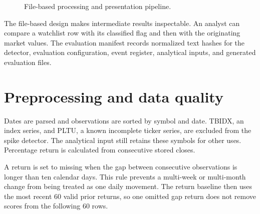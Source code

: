 \begin{figure}[htbp]
\centering
{}
\caption{File-based processing and presentation pipeline.}
\label{fig:long-pipeline}
\end{figure}

The file-based design makes intermediate results inspectable. An analyst can
compare a watchlist row with its classified flag and then with the originating
market values. The evaluation manifest records normalized text hashes for the
detector, evaluation configuration, event register, analytical inputs, and
generated evaluation files.

\section{Preprocessing and data quality}

Dates are parsed and observations are sorted by symbol and date. TBIDX, an
index series, and PLTU, a known incomplete ticker series, are excluded from the
spike detector. The analytical input still retains these symbols for other
uses. Percentage return is calculated from consecutive stored closes.

A return is set to missing when the gap between consecutive observations is
longer than ten calendar days. This rule prevents a multi-week or multi-month
change from being treated as one daily movement. The return baseline then uses
the most recent 60 valid prior returns, so one omitted gap return does not
remove scores from the following 60 rows.

